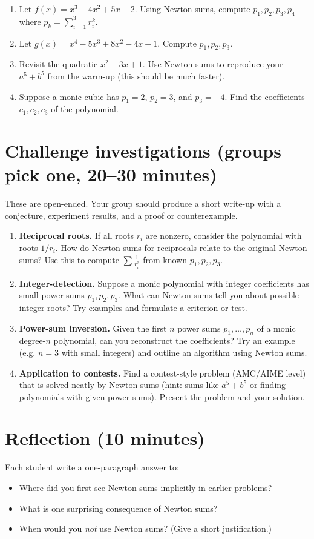\documentclass{tufte-handout}
\begin{document}
\begin{enumerate}[label=\textbf{P\arabic*.}, leftmargin=*, nosep]
  \item Let \(f(x)=x^3-4x^2+5x-2\). Using Newton sums, compute \(p_1,p_2,p_3,p_4\) where \(p_k=\sum_{i=1}^3 r_i^k\).
  \item Let \(g(x)=x^4-5x^3+8x^2-4x+1\). Compute \(p_1,p_2,p_3\).
  \item Revisit the quadratic \(x^2-3x+1\). Use Newton sums to reproduce your \(a^5+b^5\) from the warm-up (this should be much faster).
  \item Suppose a monic cubic has \(p_1=2\), \(p_2=3\), and \(p_3= -4\). Find the coefficients \(c_1,c_2,c_3\) of the polynomial.
\end{enumerate}

\section*{Challenge investigations (groups pick one, 20--30 minutes)}
These are open-ended. Your group should produce a short write-up with a conjecture, experiment results, and a proof or counterexample.

\begin{enumerate}[label=\textbf{C\arabic*.}, leftmargin=*, nosep]
  \item \textbf{Reciprocal roots.} If all roots \(r_i\) are nonzero, consider the polynomial with roots \(1/r_i\). How do Newton sums for reciprocals relate to the original Newton sums? Use this to compute \(\sum \frac{1}{r_i^3}\) from known \(p_1,p_2,p_3\).
  \item \textbf{Integer-detection.} Suppose a monic polynomial with integer coefficients has small power sums \(p_1,p_2,p_3\). What can Newton sums tell you about possible integer roots? Try examples and formulate a criterion or test.
  \item \textbf{Power-sum inversion.} Given the first \(n\) power sums \(p_1,\dots,p_n\) of a monic degree-\(n\) polynomial, can you reconstruct the coefficients? Try an example (e.g. \(n=3\) with small integers) and outline an algorithm using Newton sums.
  \item \textbf{Application to contests.} Find a contest-style problem (AMC/AIME level) that is solved neatly by Newton sums (hint: sums like \(a^5+b^5\) or finding polynomials with given power sums). Present the problem and your solution.
\end{enumerate}

\section*{Reflection (10 minutes)}
Each student write a one-paragraph answer to:
\begin{itemize}
  \item Where did you first see Newton sums implicitly in earlier problems?
  \item What is one surprising consequence of Newton sums?
  \item When would you \emph{not} use Newton sums? (Give a short justification.)
\end{itemize}
\end{document}

